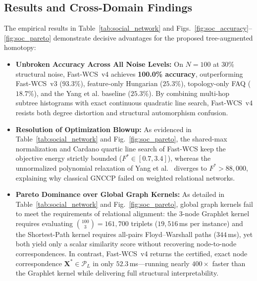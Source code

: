 \documentclass[conference]{IEEEtran}
\begin{document}
\subsection{Results and Cross-Domain Findings}
The empirical results in Table~\ref{tab:social_network} and Figs.~\ref{fig:soc_accuracy}--\ref{fig:soc_pareto} demonstrate decisive advantages for the proposed tree-augmented homotopy:
\begin{itemize}
    \item \textbf{Unbroken Accuracy Across All Noise Levels:} On $N=100$ at $30\%$ structural noise, Fast-WCS~v4 achieves \textbf{100.0\% accuracy}, outperforming Fast-WCS~v3 ($93.3\%$), feature-only Hungarian ($25.3\%$), topology-only FAQ ($18.7\%$), and the Yang et al. baseline ($25.3\%$). By combining multi-hop subtree histograms with exact continuous quadratic line search, Fast-WCS~v4 resists both degree distortion and structural automorphism confusion.
    \item \textbf{Resolution of Optimization Blowup:} As evidenced in Table~\ref{tab:social_network} and Fig.~\ref{fig:soc_pareto}, the shared-max normalization and Cardano quartic line search of Fast-WCS keep the objective energy strictly bounded ($F^* \in [0.7, 3.4]$), whereas the unnormalized polynomial relaxation of Yang et al.~\cite{yang2018algorithm} diverges to $F^* > 88,000$, explaining why classical GNCCP failed on weighted relational networks.
    \item \textbf{Pareto Dominance over Global Graph Kernels:} As detailed in Table~\ref{tab:social_network} and Fig.~\ref{fig:soc_pareto}, global graph kernels fail to meet the requirements of relational alignment: the 3-node Graphlet kernel requires evaluating $\binom{100}{3} = 161,700$ triplets ($19,516$\,ms per instance) and the Shortest-Path kernel requires all-pairs Floyd--Warshall paths ($344$\,ms), yet both yield only a scalar similarity score without recovering node-to-node correspondences. In contrast, Fast-WCS~v4 returns the certified, exact node correspondence $\mathbf{X}^* \in \mathcal{P}_L$ in only $52.3$\,ms---running nearly $400\times$ faster than the Graphlet kernel while delivering full structural interpretability.
\end{itemize}




\end{document}
